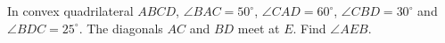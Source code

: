 In convex quadrilateral $ABCD$, $\angle BAC=50^\circ$, $\angle CAD=60^\circ$, $\angle CBD=30^\circ$ and $\angle BDC=25^\circ$. The diagonals $AC$ and $BD$ meet at $E$. Find $\angle AEB$.
